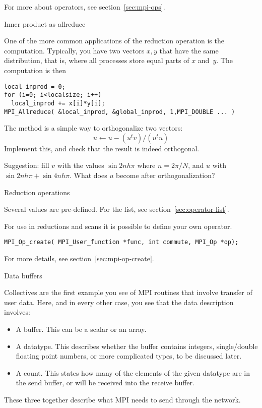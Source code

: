 For more about operators, see section~\ref{sec:mpi-ops}.

 {Inner product as allreduce}
\label{sec:dist-reduc}

One of the more common applications of the reduction operation
is the  computation. Typically, you have two vectors $x,y$
that have the same distribution, that is,
where all processes store equal parts of $x$ and~$y$.
The computation is then
\begin{lstlisting}
local_inprod = 0;
for (i=0; i<localsize; i++)
  local_inprod += x[i]*y[i];
MPI_Allreduce( &local_inprod, &global_inprod, 1,MPI_DOUBLE ... ) 
\end{lstlisting}

\begin{exercise}
  \label{ex:gramschmidt}
  The  method is a simple way to orthogonalize
  two vectors:
  \[ u \leftarrow u- (u^tv)/(u^tu) \]
  Implement this, and check that the result is indeed orthogonal.

  Suggestion: fill $v$ with the values $\sin 2nh\pi$ where $n=2\pi/N$,
  and $u$ with $\sin 2nh\pi + \sin 4nh\pi$. What does $u$ become after orthogonalization?
\end{exercise}

 {Reduction operations}
\label{sec:mpi:op-reduct}

Several  values are pre-defined. For the list,
see section~\ref{sec:operator-list}.

For use in reductions and scans it is possible to define your own operator.

\begin{lstlisting}
MPI_Op_create( MPI_User_function *func, int commute, MPI_Op *op);
\end{lstlisting}

For more details, see section~\ref{sec:mpi-op-create}.

 {Data buffers}
\label{sec:mpi-buffers}

Collectives are the first example you see of MPI routines that
involve transfer of user data. Here, and in every other case,
you see that the data description involves:
\begin{itemize}
\item A buffer. This can be a scalar or an array.
\item A datatype. This describes whether the buffer contains integers,
  single/double floating point numbers, or more complicated types, to
  be discussed later.
\item A count. This states how many of the elements of the given
  datatype are in the send buffer, or will be received into the receive buffer.
\end{itemize}
These three together describe what MPI needs to send through the network.

